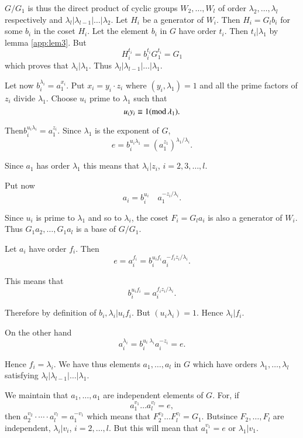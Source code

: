 $G/G_1$ is thus the direct product of cyclic groups $W_2 ,\ldots, W_l$
of order $\lambda_2 , \ldots, \lambda_l$ respectively and $\lambda_l
|\lambda_{l-1}| \ldots |\lambda_2$. Let $H_i$ be a generator of
$W_i$. Then $H_i = G_l b_i$ for some $b_i$ in the coset $H_i$. Let the
element $b_i $ in $G$ have order $t_i$. Then $t_i | \lambda_1$ by
lemma \ref{app:lem3}. But   
$$
H_i^{t_i} = b_i^{t_i}  G_1^{t_i} = G_1
$$ 
which proves that $\lambda_i | \lambda_1$. Thus $\lambda_l |
\lambda_{l-1}| \ldots| \lambda_1$.  

Let now $b_i^{\lambda_i} = a_1^{x_i}$. Put $x_i = y_i \cdot z_i$ where
$(y_i, \lambda_1) = 1$ and all the prime factors of $z_i$ divide
$\lambda_1$. Choose $u_i$ prime to $\lambda_1$ such that  
$$
u_i y_i \equiv 1 ({\rm mod} \, \lambda_1).
$$

Then\pageoriginale $b_i^{u_i \lambda_i} = a_1^{z_i}$. Since
$\lambda_1$ is the exponent of $G$,   
$$
e = b_i^{u_i \lambda_1} = (a_1^{z_1})^{\lambda_1 / \lambda_i}.
$$

Since $a_1$ has order $\lambda_1$ this means that $\lambda_i | z_i$,
$i = 2, 3,\ldots, l$.   

Put now 
$$
a_i = b_i^{u_i} \quad a_1^{-z_i / \lambda_i}. 
$$

Since $u_i$ is prime to $\lambda_1$ and so to $\lambda_i$, the coset
$F_i = G_l a_i$ is also a generator of $W_i$. Thus $G_1 a_2 ,\ldots,
G_1 a_l$ is a base of $G/G_1$. 

Let $a_i$ have order $f_i$. Then
$$
e = a_i^{f_i} = b_i ^{u_i f_i} a_i ^{-f_i z_i / \lambda_i}. 
$$

This means that 
$$
b_i ^{u_i f_i} = a_i ^{f_i z_i / \lambda_i}.
$$

Therefore by definition of $b_i , \lambda_i | u_i f_i$. But $(u_i
\lambda_i) =1$. Hence $\lambda_i | f_i$. 

On the other hand
$$
a_i^{\lambda_i} = b_i^{u_i \; \lambda_i} a_i ^{-z_i} = e.  
$$

Hence $f_i = \lambda_i$. We have thus elements $a_1 ,\ldots, a_l$ in $G$
which have orders $\lambda_1 ,\ldots, \lambda_l$ satisfying $\lambda_l
| \lambda_{l-1}|\ldots|\lambda_1$. 

We maintain that $a_1 ,\ldots, a_1$ are independent elements of
$G$. For, if 
$$
a_1^{v_1} \ldots a_l^{v_l} = e, 
$$
then $a_2^{v_2} \cdot \cdots  \cdot a_l^{v_l} = a_1^{-v_1}$ which means that
$F_2^{v_2 }\ldots F_l^{v_l} =G_1$. But\pageoriginale since $F_2
,\ldots, F_l$ are  independent, $\lambda_i | v_i$, $i = 2
,\ldots,l$. But this will mean that $a_1^{v_1} = e$ or $\lambda_1 |
v_1$.   

